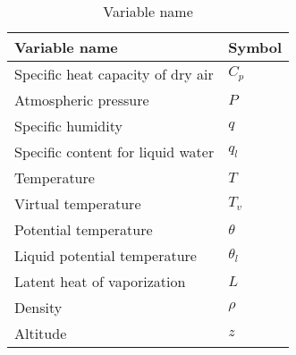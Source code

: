 \begin{table}[htbp]
\begin{center}
\begin{tabular}{|l|p{113pt}|}
\hline
\textbf{Variable name} &\textbf{Symbol} \\
\hline
Specific heat capacity of dry air & $C_{p}$ \\
\hline
Atmospheric pressure & $P$ \\
\hline
Specific humidity & $q$ \\
\hline
Specific content for liquid water & $q_{l}$ \\
\hline
Temperature & $T$ \\
\hline
Virtual temperature & $T_{v}$ \\
\hline
Potential temperature & $\theta$ \\
\hline
Liquid potential temperature & $\theta_{l}$ \\
\hline
Latent heat of vaporization & $L$ \\
\hline
Density & $\rho $ \\
\hline
Altitude & $z$ \\
\hline
\end{tabular}\label{tab3}
\caption{Variable name}
\end{center}
\end{table}
%
